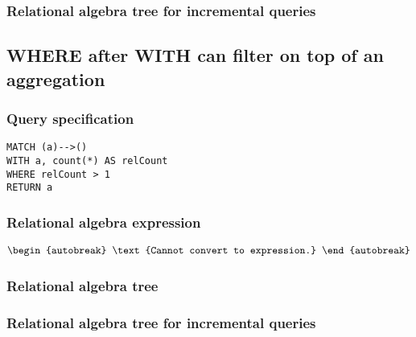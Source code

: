 \subsubsection*{Relational algebra tree for incremental queries}


\subsection{WHERE after WITH can filter on top of an aggregation}

\subsubsection*{Query specification}

\begin{lstlisting}
MATCH (a)-->()
WITH a, count(*) AS relCount
WHERE relCount > 1
RETURN a
\end{lstlisting}

\subsubsection*{Relational algebra expression}

\begin{align*}
\begin{autobreak}
\text{Cannot convert to expression.}
\end{autobreak}
\end{align*}

\subsubsection*{Relational algebra tree}


\subsubsection*{Relational algebra tree for incremental queries}

